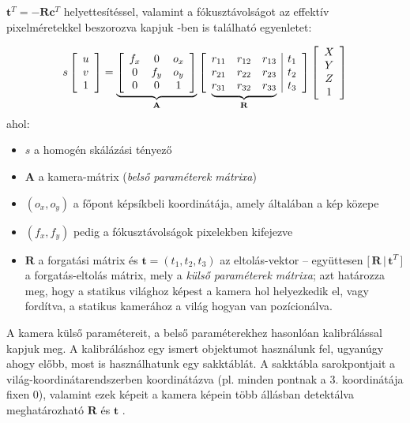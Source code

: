 $\mathbf{t}^T = -\mathbf{R}\mathbf{c}^T$ helyettesítéssel, valamint a fókusztávolságot az effektív pixelméretekkel beszorozva kapjuk \cite{camera-calib}-ben is található egyenletet:

\[s \left[\begin{array}{c}
u \\ 
v \\
1
\end{array}\right] = \underbrace{\left[\begin{array}{ccc}
f_x & 0 & o_x \\ 
0 & f_y & o_y \\
0 & 0 & 1
\end{array}\right]}_{\mathbf{A}} \left[\begin{array}{ccc|cc}
r_{11} & r_{12} & r_{13} & t_1 \\ 
r_{21} & r_{22} & r_{23} & t_2 \\
\undermat{\mathbf{R}}{r_{31} & r_{32} & r_{33}} & t_3 \\
\end{array}\right] \left[\begin{array}{c}
X \\ 
Y \\
Z \\
1
\end{array}\right]\]
ahol:
\begin{itemize}[itemsep=0pt]
\item $s$ a homogén skálázási tényező
\item $\mathbf{A}$ a kamera-mátrix (\textit{belső paraméterek mátrixa})
\item $(o_x, o_y)$ a főpont képsíkbeli koordinátája, amely általában a kép közepe
\item $(f_x, f_y)$ pedig a fókusztávolságok pixelekben kifejezve
\item $\mathbf{R}$ a forgatási mátrix és $\mathbf{t} = (t_1, t_2, t_3)$ az eltolás-vektor -- együttesen $\Big[\,\mathbf{R}\,|\,\mathbf{t}^T\,\Big]$ a forgatás-eltolás mátrix, mely a \textit{külső paraméterek mátrixa}; azt határozza meg, hogy a statikus világhoz képest a kamera hol helyezkedik el, vagy fordítva, a statikus kamerához a világ hogyan van pozícionálva.
\end{itemize}

A kamera külső paramétereit, a belső paraméterekhez hasonlóan kalibrálással kapjuk meg. A kalibráláshoz egy ismert objektumot használunk fel, ugyanúgy ahogy előbb, most is használhatunk egy sakktáblát. A sakktábla sarokpontjait a világ-koordinátarend\-szerben koordinátázva (pl. minden pontnak a 3. koordinátája fixen 0), valamint ezek képeit a kamera képein több állásban detektálva meghatározható $\mathbf{R}$ és $\mathbf{t}$ \cite{camera-calib}.
